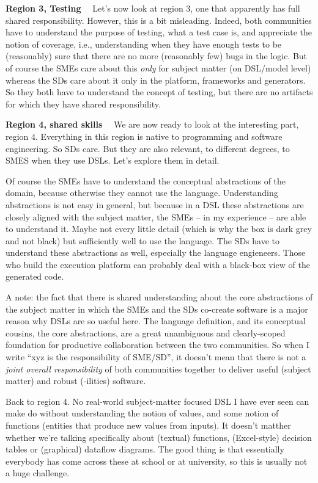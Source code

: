 \documentclass[runningheads]{llncs}
\newcommand\parhead[1]{\vspace{1mm}\noindent\textbf{{#1}}\ \ }
\begin{document}
\parhead{Region 3, Testing} Let's now look at region 3, one that apparently has
full shared responsibility. However, this is a bit misleading. Indeed, both communities
have to understand the purpose of testing, what a test case is, and appreciate
the notion of coverage, i.e., understanding when they have enough tests to be
(reasonably) sure that there are no more (reasonably few) bugs in the logic. But
of course the SMEs care about this \emph{only} for subject matter (on DSL/model
level) whereas the SDs care about it only in the platform, frameworks and
generators. So they both have to understand the concept of testing, but there
are no artifacts for which they have shared responsibility.

\parhead{Region 4, shared skills} We are now ready to look at the interesting
part, region 4. Everything in this region is native to programming and software
engineering. So SDs care. But they are also relevant, to different degrees, to
SMES when they use DSLs. Let's explore them in detail.

Of course the SMEs have to understand the conceptual abstractions of the domain,
because otherwise they cannot use the language.
Understanding abstractions is not easy in general, but because in a DSL these
abstractions are closely aligned with the subject matter, the SMEs -- in my
experience -- are able to understand it. Maybe not every little detail (which is
why the box is dark grey and not black) but sufficiently well to use the
language. The SDs have to understand these abstractions as well, especially the
language engieneers. Those who build the execution platform can probably deal
with a black-box view of the generated code.

A note: the fact that there is shared understanding about the core abstractions
of the subject matter in which the SMEs and the SDs co-create software is a major
reason why DSLs are so useful here. The language definition, and its conceptual
cousins, the core abstractions, are a great unambiguous and clearly-scoped
foundation for productive collaboration between the two communities. So when
I write ``xyz is the responsibility of SME/SD'', it doesn't mean that there is 
not a \emph{joint overall responsibility} of both communities together to deliver
useful (subject matter) and robust (-ilities) software. 

Back to region 4. No real-world subject-matter focused DSL I have ever seen can
make do without understanding the notion of values, and some notion of functions
(entities that produce new values from inputs). It doesn't matther whether we're
talking specifically about (textual) functions, (Excel-style) decision tables or
(graphical) dataflow diagrams. The good thing is that essentially everybody has
come across these at school or at university, so this is usually not a huge
challenge. 
\end{document}
